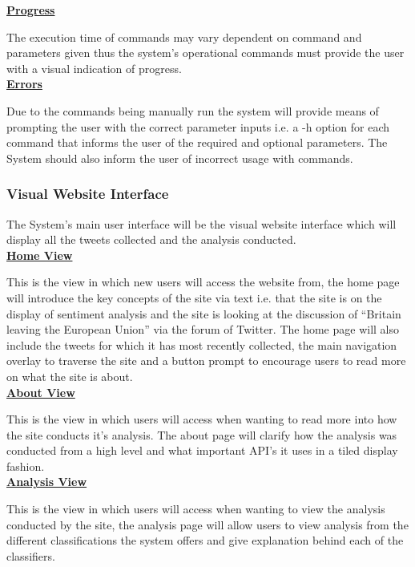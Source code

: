 \documentclass[11pt]{report}
\begin{document}
\textbf{\underline{Progress}}

The execution time of commands may vary dependent on command and parameters given thus the system's operational commands must provide the user with a visual indication of progress.
\\

\textbf{\underline{Errors}}

Due to the commands being manually run the system will provide means of prompting the user with the correct parameter inputs i.e. a -h option for each command that informs the user of the required and optional parameters. The System should also inform the user of incorrect usage with commands.

\subsubsection*{Visual Website Interface}
The System's main user interface will be the visual website interface which will display all the tweets collected and the analysis conducted. 
\\

\textbf{\underline{Home View}}

This is the view in which new users will access the website from, the home page will introduce the key concepts of the site via text i.e. that the site is on the display of sentiment analysis and the site is looking at the discussion of ``Britain leaving the European Union'' via the forum of Twitter. The home page will also include the tweets for which it has most recently collected, the main navigation overlay to traverse the site and a button prompt to encourage users to read more on what the site is about.
\\

\textbf{\underline{About View}}

This is the view in which users will access when wanting to read more into how the site conducts it's analysis. The about page will clarify how the analysis was conducted from a high level and what important API's it uses in a tiled display fashion.
\\

\textbf{\underline{Analysis View}}

This is the view in which users will access when wanting to view the analysis conducted by the site, the analysis page will allow users to view analysis from the different classifications the system offers and give explanation behind each of the classifiers.
\\
\end{document}
